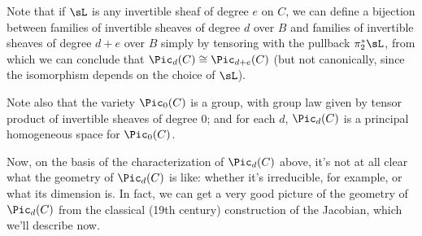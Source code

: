  Note that if $\sL$ is any invertible sheaf of degree $e$ on $C$, we can define a bijection between families of invertible sheaves of degree $d$ over $B$ and families of invertible sheaves of degree $d+e$ over $B$ simply by tensoring with the pullback $\pi_2^*\sL$, from which we can conclude that $\Pic_d(C) \cong \Pic_{d+e}(C)$ (but not canonically, since the isomorphism depends on the choice of $\sL$).
 
 Note also that the variety $\Pic_0(C)$ is a group, with group law given by tensor product of invertible sheaves of degree 0; and for each $d$, $\Pic_d(C)$ is a principal homogeneous space for $\Pic_0(C)$. 
 
 Now, on the basis of the characterization of $\Pic_d(C)$ above, it's not at all clear what the geometry of $\Pic_d(C)$ is like: whether it's irreducible, for example, or what its dimension is. In fact, we can get a very good picture of the geometry of $\Pic_d(C)$ from the classical (19th century) construction of the Jacobian, which we'll describe now.
 
%
%
%

